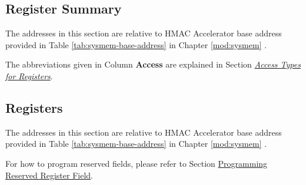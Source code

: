 \documentclass[main\_\_EN.tex]{subfiles}
\begin{document}



\newpage
\hypertarget{hmac-reg-summ}{}
\subsection{Register Summary}
\label{sec:hmac-reg-summ}

The addresses in this section are relative to HMAC Accelerator base address provided in Table \ref{tab:sysmem-base-address} in Chapter \ref{mod:sysmem} \textit{}.

The abbreviations given in Column \textbf{Access} are explained in Section \hyperref[glossary-access-types]{\textit{Access Types for Registers}}.






\newpage
\subsection{Registers}

The addresses in this section are relative to HMAC Accelerator base address provided in Table \ref{tab:sysmem-base-address} in Chapter \ref{mod:sysmem} \textit{}.

For how to program reserved fields, please refer to Section \hyperref[programming-reserved-field]{Programming Reserved Register Field}.


\end{document}
